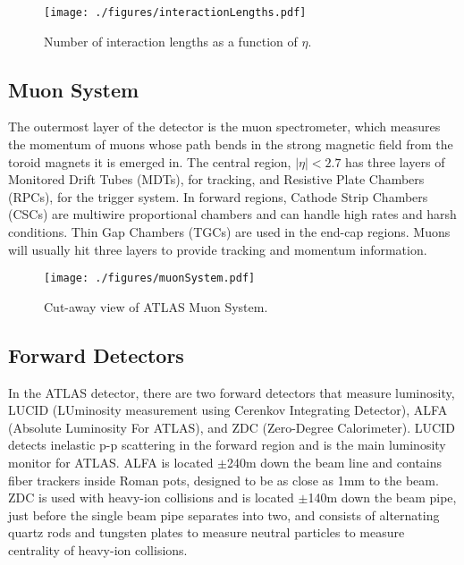 \begin{figure}[h!]
  \centering
	\texttt{[image: ./figures/interactionLengths.pdf]}
\caption{\label{fig:interactionLengths}{ Number of interaction lengths as a function of $\eta$. }} %
\end{figure}


\subsection{Muon System}

The outermost layer of the detector is the muon spectrometer, which measures the momentum of muons whose path bends in the strong magnetic field from the toroid magnets it is emerged in.  The central region, $|\eta|<2.7$ has three layers of Monitored Drift Tubes (MDTs), for tracking, and Resistive Plate Chambers (RPCs), for the trigger system.  In forward regions, Cathode Strip Chambers (CSCs) are multiwire proportional chambers and can handle high rates and harsh conditions.  Thin Gap Chambers (TGCs) are used in the end-cap regions.  Muons will usually hit three layers to provide tracking and momentum information.

\begin{figure}[h!]
  \centering
	\texttt{[image: ./figures/muonSystem.pdf]}
\caption{\label{fig:muonCutAway}{ Cut-away view of ATLAS Muon System. }} %
\end{figure}

%


  

\subsection{Forward Detectors}

In the ATLAS detector, there are two forward detectors that measure luminosity, LUCID (LUminosity measurement using Cerenkov Integrating Detector), ALFA (Absolute Luminosity For ATLAS), and ZDC (Zero-Degree Calorimeter).  LUCID detects inelastic p-p scattering in the forward region and is the main luminosity monitor for ATLAS.  ALFA is located $\pm$240m down the beam line and contains fiber trackers inside Roman pots, designed to be as close as 1mm to the beam.  ZDC is used with heavy-ion collisions and is located $\pm$140m down the beam pipe, just before the single beam pipe separates into two, and consists of alternating quartz rods and tungsten plates to measure neutral particles to measure centrality of heavy-ion collisions.

